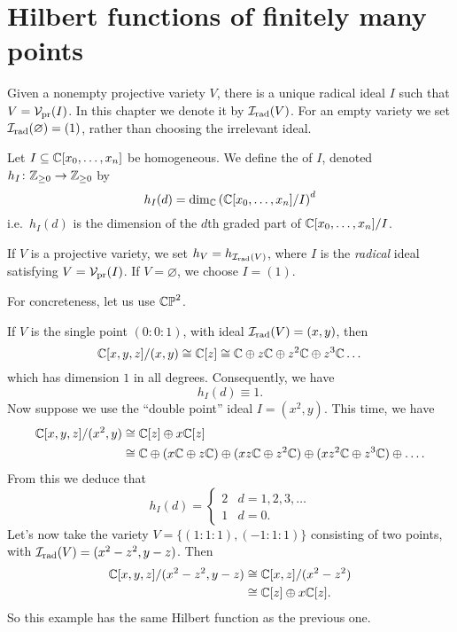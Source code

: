 \section{Hilbert functions of finitely many points}
\begin{definition}
	Given a nonempty projective variety $V$, there is a unique
	radical ideal $I$ such that $V = \mathcal V_{\text{pr}}(I)$.
	In this chapter we denote it by $\mathcal I_{\text{rad}}(V)$.
	For an empty variety we set $\mathcal I_{\text{rad}}(\varnothing) = (1)$,
	rather than choosing the irrelevant ideal.
\end{definition}
\begin{definition}
	Let $I \subseteq \mathbb C[x_0, \dots, x_n]$ be homogeneous.
	We define the  of $I$,
	denoted $h_I \colon \mathbb Z_{\ge 0} \to \mathbb Z_{\ge 0}$ by
	\[ h_I(d) = \dim_{\mathbb C} \left( \mathbb C[x_0, \dots, x_n]/I \right)^d \]
	i.e.\ $h_I(d)$ is the dimension of the $d$th graded part of
	$\mathbb C[x_0, \dots, x_n] / I$.
\end{definition}
\begin{definition}
	If $V$ is a projective variety, we set $h_V = h_{\mathcal I_{\text{rad}}(V)}$,
	where $I$ is the \emph{radical} ideal satisfying $V = \mathcal V_{\text{pr}}(I)$.
	If $V = \varnothing$, we choose $I = (1)$.
\end{definition}
\begin{example}
	\label{ex:hilbert_zero}
	For concreteness, let us use $\mathbb{CP}^2$.
	\begin{enumerate}[(a)]
		\ii If $V$ is the single point $(0:0:1)$,
		with ideal $\mathcal I_{\text{rad}}(V) = (x,y)$,
		then
		\[ \mathbb C[x,y,z] / (x,y) \cong \mathbb C[z]
		\cong \mathbb C \oplus z\mathbb C \oplus z^2\mathbb C \oplus z^3\mathbb C \dots \]
		which has dimension $1$ in all degrees.
		Consequently, we have \[ h_I(d) \equiv 1. \]
		\ii Now suppose we use the ``double point'' ideal $I = (x^2,y)$.
		This time, we have
		\begin{align*}
			\mathbb C[x,y,z] / (x^2,y)
			&\cong \mathbb C[z] \oplus x\mathbb C[z] \\
			&\cong \mathbb C \oplus (x\mathbb C \oplus z\mathbb C) \oplus (xz\mathbb C \oplus z^2\mathbb C)
			\oplus (xz^2\mathbb C \oplus z^3\mathbb C) \oplus\dots.
		\end{align*}
		From this we deduce that
		\[
			h_I(d) =
			\begin{cases}
				2 & d = 1, 2, 3, \dots \\
				1 & d = 0.
			\end{cases}
		\]
		\ii Let's now take the variety $V = \{(1:1:1), (-1:1:1)\}$
		consisting of two points, with $\mathcal I_{\text{rad}}(V) = (x^2-z^2, y-z)$. Then
		\begin{align*}
			\mathbb C[x,y,z] / (x^2-z^2,y-z)
			&\cong \mathbb C[x,z] / (x^2-z^2) \\
			&\cong \mathbb C[z] \oplus x\mathbb C[z].
		\end{align*}
		So this example has the same Hilbert function as the previous one.
	\end{enumerate}
\end{example}
